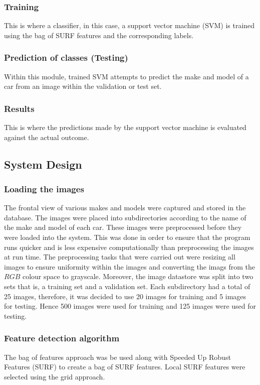 \documentclass[a4paper, 12pt]{article}
\begin{document}
\subsubsection{Training}
This is where a classifier, in this case, a support vector machine (SVM) is trained using the bag of SURF features and the corresponding labels. 

\subsubsection{Prediction of classes (Testing)}
Within this module, trained SVM attempts to predict the make and model of a car from an image within the validation or test set.

\subsubsection{Results}
This is where the predictions made by the support vector machine is evaluated against the actual outcome. 

\subsection{System Design}

\subsubsection{Loading the images}
The frontal view of various makes and models were captured and stored in the database. The images were placed into subdirectories according to the name of the make and model of each car. These images were preprocessed before they were loaded into the system. This was done in order to ensure that the program runs quicker and is less expensive computationally than preprocessing the images at run time. The preprocessing tasks that were carried out were resizing all images to ensure uniformity within the images and converting the imags from the $RGB$ colour space to grayscale. Moreover, the image datastore was split into two sets that is, a training set and a validation set. Each subdirectory had a total of 25 images, therefore, it was decided to use 20 images for training and 5 images for testing. Hence 500 images were used for training and 125 images were used for testing. 

\subsubsection{Feature detection algorithm} 
The bag of features approach was be used along with Speeded Up Robust Features (SURF) to create a bag of SURF features. Local SURF features were selected using the grid approach. 
\end{document}
